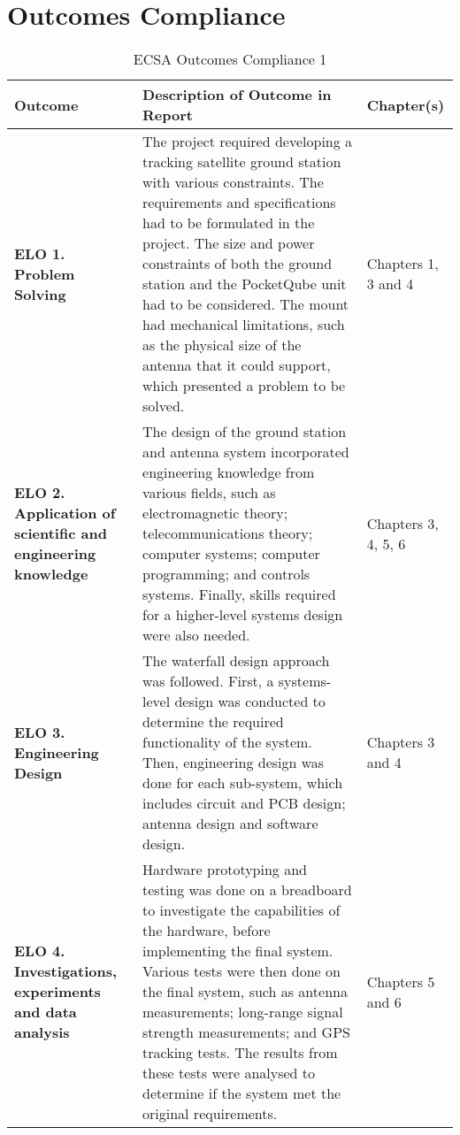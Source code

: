 \chapter{Outcomes Compliance}
\begin{table}[!htb]
  \centering
  \renewcommand{\arraystretch}{1.2}
  \begin{tabular}{ |p{4cm}|p{8cm}|p{3cm}| }
  \hline
  \textbf{Outcome}        & \textbf{Description of Outcome in Report}     & \textbf{Chapter(s)} \\
  \hline
  \textbf{ELO 1. Problem Solving} &
  The project required developing a tracking satellite ground station with various constraints. The requirements and specifications had to be formulated in the project. The size and power constraints of both the ground station and the PocketQube unit had to be considered. The mount had mechanical limitations, such as the physical size of the antenna that it could support, which presented a problem to be solved. &
  Chapters 1, 3 and 4 \\ \hline
  \textbf{ELO 2. Application of scientific and engineering knowledge} &
  The design of the ground station and antenna system incorporated engineering knowledge from various fields, such as electromagnetic theory; telecommunications theory; computer systems; computer programming; and controls systems. Finally, skills required for a higher-level systems design were also needed. &
  Chapters 3, 4, 5, 6 \\ \hline
  \textbf{ELO 3. Engineering Design} &
  The waterfall design approach was followed. First, a systems-level design was conducted to determine the required functionality of the system. Then, engineering design was done for each sub-system, which includes circuit and PCB design; antenna design and software design.  &
  Chapters 3 and 4 \\ \hline
  \textbf{ELO 4. Investigations, experiments and data analysis} &
  Hardware prototyping and testing was done on a breadboard to investigate the capabilities of the hardware, before implementing the final system. Various tests were then done on the final system, such as antenna measurements; long-range signal strength measurements; and GPS tracking tests. The results from these tests were analysed to determine if the system met the original requirements. &
  Chapters 5 and 6 \\ \hline
  \end{tabular}
  \caption{ECSA Outcomes Compliance 1}
  \label{tab:outcomesCompliance1}
\end{table}

